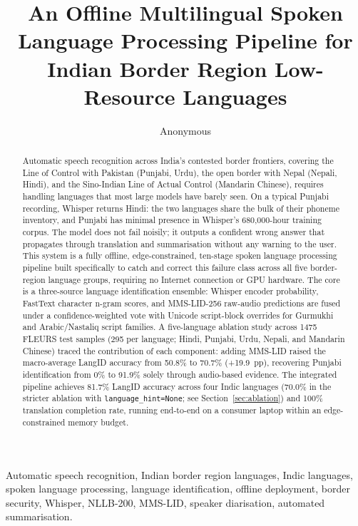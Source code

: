 \documentclass[conference]{IEEEtran}
\begin{document}
\title{An Offline Multilingual Spoken Language Processing Pipeline for Indian Border Region Low-Resource Languages}

\author{Anonymous}

\maketitle

\begin{abstract}
Automatic speech recognition across India's contested border frontiers, covering the Line of Control with Pakistan (Punjabi, Urdu), the open border with Nepal (Nepali, Hindi), and the Sino-Indian Line of Actual Control (Mandarin Chinese), requires handling languages that most large models have barely seen. On a typical Punjabi recording, Whisper returns Hindi: the two languages share the bulk of their phoneme inventory, and Punjabi has minimal presence in Whisper's 680,000-hour training corpus. The model does not fail noisily; it outputs a confident wrong answer that propagates through translation and summarisation without any warning to the user. This system is a fully offline, edge-constrained, ten-stage spoken language processing pipeline built specifically to catch and correct this failure class across all five border-region language groups, requiring no Internet connection or GPU hardware. The core is a three-source language identification ensemble: Whisper encoder probability, FastText character n-gram scores, and MMS-LID-256 raw-audio predictions are fused under a confidence-weighted vote with Unicode script-block overrides for Gurmukhi and Arabic/Nastaliq script families. A five-language ablation study across 1475 FLEURS test samples (295 per language; Hindi, Punjabi, Urdu, Nepali, and Mandarin Chinese) traced the contribution of each component: adding MMS-LID raised the macro-average LangID accuracy from 50.8\% to 70.7\% (+19.9~pp), recovering Punjabi identification from 0\% to 91.9\% solely through audio-based evidence. The integrated pipeline achieves 81.7\% LangID accuracy across four Indic languages (70.0\% in the stricter ablation with \texttt{language\_hint=None}; see Section~\ref{sec:ablation}) and 100\% translation completion rate, running end-to-end on a consumer laptop within an edge-constrained memory budget.
\end{abstract}

\begin{IEEEkeywords}
Automatic speech recognition, Indian border region languages, Indic languages, spoken language processing, language identification, offline deployment, border security, Whisper, NLLB-200, MMS-LID, speaker diarisation, automated summarisation.
\end{IEEEkeywords}
\end{document}
